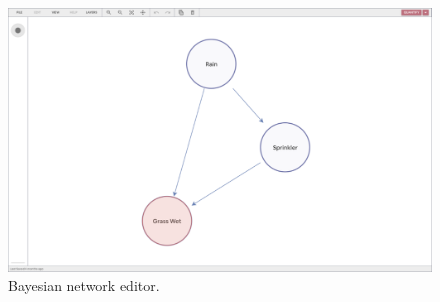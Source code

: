 \begin{figure}
  \centering
  \includegraphics[width=\textwidth]{4_proposed_solution/web_app/figures/bn.png}
  \caption{Bayesian network editor.}
  \label{fig:bn_editor}
\end{figure}